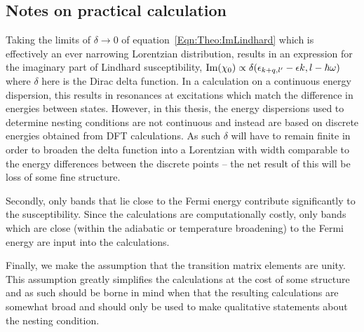 \subsection{Notes on practical calculation}

Taking the limits of $\delta \to 0$ of equation~\ref{Eqn:Theo:ImLindhard} which is effectively an ever narrowing Lorentzian distribution, results in an expression for the imaginary part of Lindhard susceptibility, $\operatorname{Im}(\chi_0)\propto \delta(\epsilon_{k+q,l^\prime} - \epsilon{k,l} - \hbar\omega)$ where $\delta$ here is the Dirac delta function. In a calculation on a continuous energy dispersion, this results in resonances at excitations which match the difference in energies between states. However, in this thesis, the energy dispersions used to determine nesting conditions are not continuous and instead are based on discrete energies obtained from \ac{DFT} calculations. As such $\delta$ will have to remain finite in order to broaden the delta function into a Lorentzian with width comparable to the energy differences between the discrete points -- the net result of this will be loss of some fine structure.

Secondly, only bands that lie close to the Fermi energy contribute significantly to the susceptibility. Since the calculations are computationally costly, only bands which are close (within the adiabatic or temperature broadening) to the Fermi energy are input into the calculations.

Finally, we make the assumption that the transition matrix elements are unity. This assumption greatly simplifies the calculations at the cost of some structure and as such should be borne in mind when that the resulting calculations are somewhat broad and should only be used to make qualitative statements about the nesting condition.

